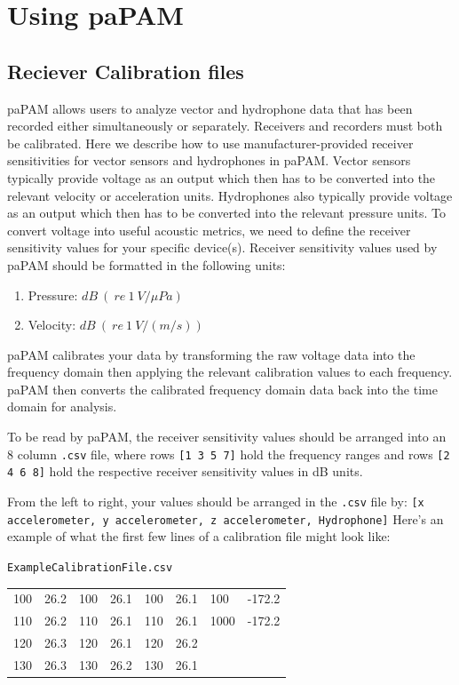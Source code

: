 \documentclass[11pt]{report}
\begin{document}
\chapter{Using paPAM}

\section{Reciever Calibration files} \label{CalibrationFiles}

paPAM allows users to analyze vector and hydrophone data that has been recorded either simultaneously or separately. Receivers and recorders must both be calibrated.  Here we describe how to use manufacturer-provided receiver sensitivities for vector sensors and hydrophones in paPAM.  Vector sensors typically provide voltage as an output which then has to be converted into the relevant velocity or acceleration units.  Hydrophones also typically provide voltage as an output which then has to be converted into the relevant pressure units.  To convert voltage into useful acoustic metrics, we need to define the receiver sensitivity values for your specific device(s).  Receiver sensitivity values used by paPAM should be formatted in the following units:

\begin{enumerate}
	\item Pressure: $ \mathit{dB}\ (\ \mathit{re\ 1\ V/\mu Pa})$
	\item Velocity: $\mathit{dB} \ (\ \mathit{re\ 1\ V/\left(m/s\right)})$
\end{enumerate}

paPAM calibrates your data by transforming the raw voltage data into the frequency domain then applying the relevant calibration values to each frequency.  paPAM then converts the calibrated frequency domain data back into the time domain for analysis.
	
To be read by paPAM, the receiver sensitivity values should be arranged into an 8 column \texttt{.csv} file, where rows \texttt{[1 3 5 7]} hold the frequency ranges and rows \texttt{[2 4 6 8]} hold the respective receiver sensitivity values in dB units.

\begin{samepage}

 From the left to right, your values should be arranged in the \texttt{.csv} file by: \texttt{[x accelerometer, y accelerometer, z accelerometer, Hydrophone]}
Here's an example of what the first few lines of a calibration file might look like:

\texttt{ExampleCalibrationFile.csv}\\
\begin{tabular}{l l l l l l l l}
\hline
100 & 26.2 & 100 & 26.1 & 100 & 26.1 & 100 & -172.2 \\
110 & 26.2 & 110 & 26.1 & 110 & 26.1 & 1000 & -172.2 \\
120 & 26.3 & 120 & 26.1 & 120 & 26.2\\
130 & 26.3 & 130 & 26.2 & 130 & 26.1\\
\hline
\end{tabular}
\end{samepage}\\
\end{document}
